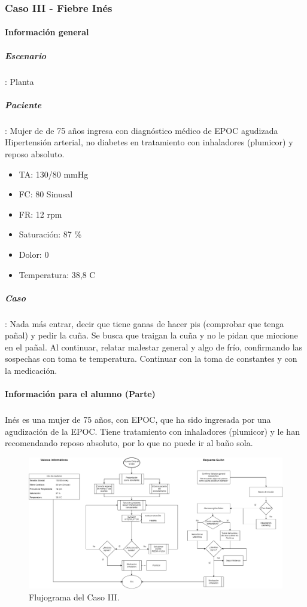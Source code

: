 \subsubsection{Caso III - Fiebre Inés}
\begin{multicols}{2}
    \paragraph{Información general}
    \subparagraph{Escenario}: Planta
    \subparagraph{Paciente}: Mujer de de 75 años ingresa con diagnóstico médico de EPOC agudizada Hipertensión arterial, no diabetes en tratamiento con inhaladores (plumicor) y reposo absoluto.
    \begin{itemize}[topsep=0pt, partopsep=0pt,itemsep=0pt,parsep=0pt]
        \item TA: 130/80 mmHg
        \item FC: 80 Sinusal
        \item FR: 12 rpm
        \item Saturación: 87 \%
        \item Dolor: 0
        \item Temperatura: 38,8 C
    \end{itemize}
    \subparagraph{Caso}: Nada más entrar, decir que tiene ganas de hacer pis (comprobar que tenga pañal) y pedir la cuña. Se busca que traigan la cuña y no le pidan que miccione en el pañal. Al continuar, relatar malestar general y algo de frío, confirmando las sospechas con toma te temperatura. Continuar con la toma de constantes y con la medicación.
    \columnbreak
    \paragraph{Información para el alumno (Parte)}
    \subparagraph{} Inés es una mujer de 75 años, con EPOC, que ha sido ingresada por una agudización de la EPOC. Tiene tratamiento con inhaladores (plumicor) y le han recomendando reposo absoluto, por lo que no puede ir al baño sola.
\end{multicols}
\begin{figure}[H]
    \centering
	\includegraphics[width=\textwidth]{./imagenes/ACV-AdSC-CasoIIIDiagramaFlujoIIEnf.png}
	\caption{\label{fig:PlanXVII:CasoIII}Flujograma del Caso III.}
\end{figure}
\clearpage

